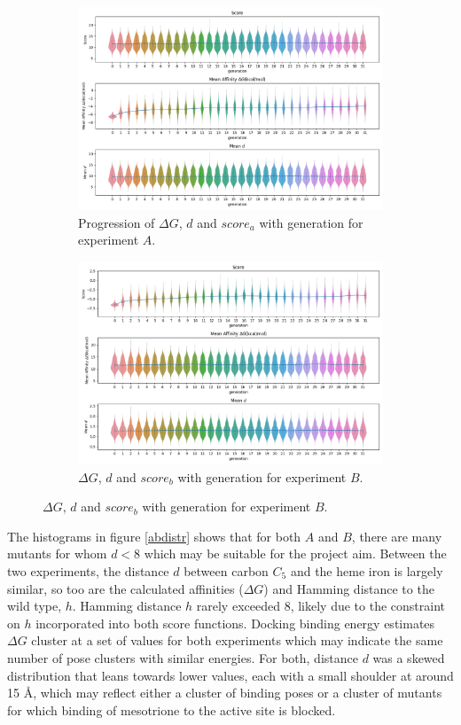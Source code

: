 \documentclass[16pt]{book}
\begin{document}
\begin{figure}
	\caption{\label{violin}}
\begin{subfigure}{\textwidth}
	\caption{\label{violina} Progression of $\Delta G$, $d$ and $score_a$ with generation for experiment $A$.}
	\includegraphics[width=\textwidth]{img/generation-global-dist_mean-a.png}
\end{subfigure}
\begin{subfigure}{\textwidth}
	\caption{\label{violinb} $\Delta G$, $d$ and $score_b$ with generation for experiment $B$.}
	\includegraphics[width=\textwidth]{img/generation-global-dist_mean-b.png}
\end{subfigure}
\end{figure}

The histograms in figure \ref{abdistr} shows that for both $A$ and $B$, there are many mutants for whom $d < 8$ which may be suitable for the project aim.
Between the two experiments, the distance $d$ between carbon $C_5$ and the heme iron is largely similar, so too are the calculated affinities ($\Delta G$) and Hamming distance to the wild type, $h$.
Hamming distance $h$ rarely exceeded 8, likely due to the constraint on $h$ incorporated into both score functions.
Docking binding energy estimates $\Delta G$ cluster at a set of values for both experiments which may indicate the same number of pose clusters with similar energies. 
For both, distance $d$ was a skewed distribution that leans towards lower values, each with a small shoulder at around 15 \AA, which may reflect either a cluster of binding poses or a cluster of mutants for which binding of mesotrione to the active site is blocked.
\end{document}
